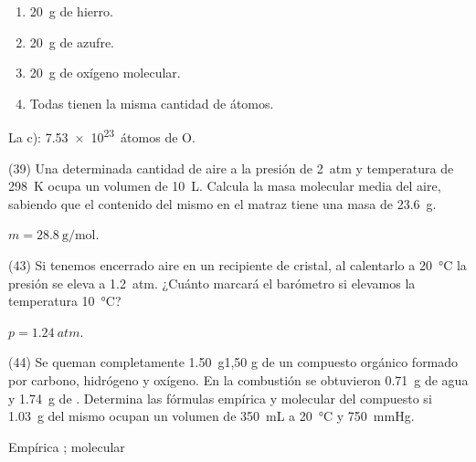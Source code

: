 \documentclass[10pt]{article}
\begin{document}
\begin{multicols}{2}
\begin{exercise}
  \begin{enumerate}
    \item \SI{20}{\gram} de hierro.
    \item \SI{20}{\gram} de azufre.
    \item \SI{20}{\gram} de oxígeno molecular.
    \item Todas tienen la misma cantidad de átomos.
  \end{enumerate}
\end{exercise}

\begin{solution}
  La c): \SI{7.53e23}{átomos} de O.
\end{solution}


\begin{exercise}
  (39) Una determinada cantidad de aire a la presión de \SI{2}{atm} y
  temperatura de \SI{298}{\kelvin} ocupa un volumen de \SI{10}{\liter}. Calcula la masa molecular media del aire, sabiendo que el contenido del
  mismo en el matraz tiene una masa de \SI{23.6}{\gram}.
\end{exercise}

\begin{solution}
  \( m = \SI{28.8}{\gram\per\mole} \).
\end{solution}


\begin{exercise}
  (43) Si tenemos encerrado aire en un recipiente de cristal, al
  calentarlo a \SI{20}{\celsius} la presión se eleva a \SI{1.2}{atm}. ¿Cuánto marcará el barómetro si elevamos la temperatura \SI{10}{\celsius}?
\end{exercise}

\begin{solution}
  \( p = \SI{1.24}{atm} \).
\end{solution}


\begin{exercise}
  (44) Se queman completamente \SI{1.50}{\gram}1,50 g de un compuesto orgánico
  formado por carbono, hidrógeno y oxígeno. En la combustión
  se obtuvieron \SI{0.71}{\gram} de agua y \SI{1.74}{\gram} de . Determina las fórmulas empírica y molecular del compuesto si
  \SI{1.03}{\gram} del mismo ocupan un volumen de \SI{350}{\milli\liter} a \SI{20}{\celsius} y \SI{750}{\mmHg}.
\end{exercise}

\begin{solution}
  Empírica ; molecular 
\end{solution}



\end{multicols}
\end{document}
